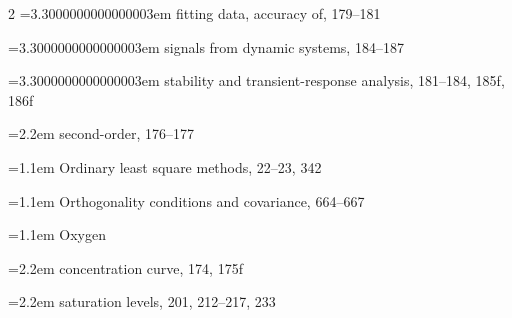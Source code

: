 \begin{multicols}{2}
\noindent\hangindent=3.3000000000000003em \hspace*{2.2em}fitting data, accuracy of, 179--181\par
\noindent\hangindent=3.3000000000000003em \hspace*{2.2em}signals from dynamic systems, 184--187\par
\noindent\hangindent=3.3000000000000003em \hspace*{2.2em}stability and transient-response analysis, 181--184, 185f, 186f\par
\noindent\hangindent=2.2em \hspace*{1.1em}second-order, 176--177\par
\noindent\hangindent=1.1em Ordinary least square methods, 22--23, 342\par
\noindent\hangindent=1.1em Orthogonality conditions and covariance, 664--667\par
\noindent\hangindent=1.1em Oxygen\par
\noindent\hangindent=2.2em \hspace*{1.1em}concentration curve, 174, 175f\par
\noindent\hangindent=2.2em \hspace*{1.1em}saturation levels, 201, 212--217, 233\par


\end{multicols}
